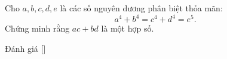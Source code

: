 \ifshowproblem
\begin{problem}\label{problem:USA-2015-MO-P5}
    Cho \( a, b, c, d, e \) là các số nguyên dương phân biệt thỏa mãn:
    \[
    a^4 + b^4 = c^4 + d^4 = e^5.
    \]
    Chứng minh rằng \( ac + bd \) là một hợp số.
\end{problem}
\fi

\ifshowinfo
Đánh giá [\textbf{}]\footnotemark
{}
\fi